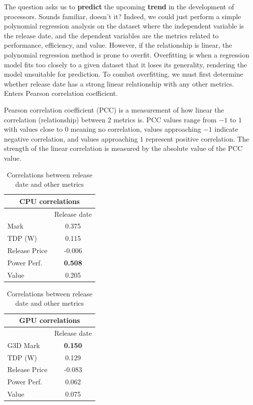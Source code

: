 \documentclass[conference]{IEEEtran}
\begin{document}
The question asks us to \textbf{predict} the upcoming \textbf{trend} in the
development of processors. Sounds familiar, doesn't it? Indeed, we could just
perform a simple polynomial regression analysis on the dataset where the
independent variable is the release date, and the dependent variables are the
metrics related to performance, efficiency, and value. However, if the
relationship is linear, the polynomial regression method is prone to overfit.
Overfitting is when a regression model fits too closely to a given dataset that
it loses its generality, rendering the model unsuitable for prediction. To
combat overfitting, we must first determine whether release date has a strong
linear relationship with any other metrics. Enters Pearson correlation
coefficient.

Pearson correlation coefficient (PCC) is a measurement of how linear the
correlation (relationship) between 2 metrics is. PCC values range from
$-1$ to $1$ with values close to $0$ meaning no correlation, values
approaching $-1$ indicate negative correlation, and values approaching $1$
represent positive correlation. The strength of the linear correlation is
measured by the absolute value of the PCC value.

\begin{table}[htbp]
	\caption{Correlations between release date and other metrics}
	\begin{center}
		\begin{tabular}[t]{|l|c|}
			\hline
			\multicolumn{2}{|c|}{\textbf{CPU correlations}} \\
			\hline
			              & Release date                    \\
			\hline
			Mark          & 0.375                           \\
			\hline
			TDP (W)       & 0.115                           \\
			\hline
			Release Price & -0.006                          \\
			\hline
			Power Perf.   & \textbf{0.508}                  \\
			\hline
			Value         & 0.205                           \\
			\hline
		\end{tabular}
		\quad
		\begin{tabular}[t]{|l|c|}
			\hline
			\multicolumn{2}{|c|}{\textbf{GPU correlations}} \\
			\hline
			              & Release date                    \\
			\hline
			G3D Mark      & \textbf{0.150}                  \\
			\hline
			TDP (W)       & 0.129                           \\
			\hline
			Release Price & -0.083                          \\
			\hline
			Power Perf.   & 0.062                           \\
			\hline
			Value         & 0.075                           \\
			\hline
		\end{tabular}
	\end{center}
	\label{tab1}
\end{table}
\end{document}
